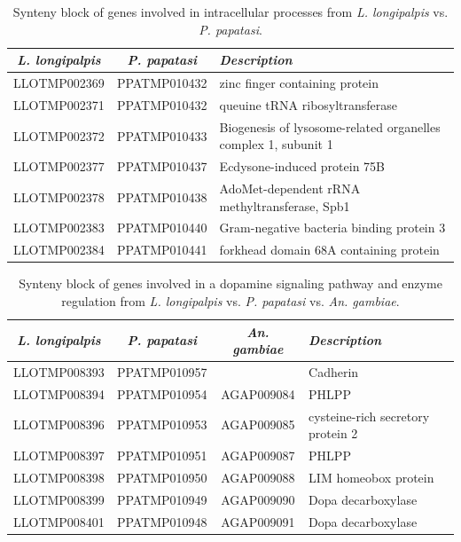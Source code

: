 \begin{table}[H]
  \centering
  \begin{tabular}{c c l} \hline
    \emph{L. longipalpis} & \emph{P. papatasi} & \emph{Description} \\ \hline
    LLOTMP002369 & PPATMP010432 & zinc finger containing protein \\
    LLOTMP002371 & PPATMP010432 & queuine tRNA ribosyltransferase \\
    LLOTMP002372 & PPATMP010433 & Biogenesis of lysosome-related organelles complex 1, subunit 1 \\
    LLOTMP002377 & PPATMP010437 & Ecdysone-induced protein 75B \\
    LLOTMP002378 & PPATMP010438 & AdoMet-dependent rRNA methyltransferase, Spb1 \\
    LLOTMP002383 & PPATMP010440 & Gram-negative bacteria binding protein 3 \\
    LLOTMP002384 & PPATMP010441 & forkhead domain 68A containing protein
    \end{tabular}
    \caption{Synteny block of genes involved in intracellular processes from \emph{L. longipalpis} vs. \emph{P. papatasi}.}
  \label{tab:synteny-llot-ppat-intracellular}
\end{table}

\begin{table}[H]
  \centering
  \begin{tabular}{c c c l} \hline
    \emph{L. longipalpis} & \emph{P. papatasi} & \emph{An. gambiae} & \emph{Description} \\ \hline
    LLOTMP008393 & PPATMP010957 & & Cadherin \\
    LLOTMP008394 & PPATMP010954 & AGAP009084 & PHLPP \\
    LLOTMP008396 & PPATMP010953 & AGAP009085 & cysteine-rich secretory protein 2 \\
    LLOTMP008397 & PPATMP010951 & AGAP009087 & PHLPP \\
    LLOTMP008398 & PPATMP010950 & AGAP009088 & LIM homeobox protein \\
    LLOTMP008399 & PPATMP010949 & AGAP009090 & Dopa decarboxylase \\
    LLOTMP008401 & PPATMP010948 & AGAP009091 & Dopa decarboxylase
    \end{tabular}
    \caption{Synteny block of genes involved in a dopamine signaling pathway and enzyme regulation from \emph{L. longipalpis} vs. \emph{P. papatasi} vs. \emph{An. gambiae}.}
  \label{tab:synteny-three-way-dopamine}
\end{table}

